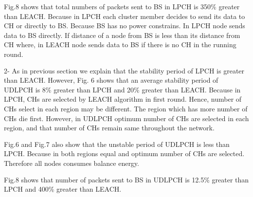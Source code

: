 \documentclass[journal]{IEEEtran}
\begin{document}
Fig.8 shows that total numbers of packets sent to BS in LPCH is 350\% greater than LEACH. Because in LPCH each cluster member decides to send its data to CH or directly to BS. Because BS has no power constrains. In LPCH node sends data to BS directly. If distance of a node from BS is less than its distance from CH where, in LEACH node sends data to BS if there is no CH in the running round.

{2}- As in previous section we explain that the stability period of LPCH is greater than LEACH. However, Fig. 6 shows that an average stability period of UDLPCH is 8\% greater than LPCH and 20\% greater than LEACH. Because in LPCH, CHs are selected by LEACH algorithm in first round. Hence, number of CHs select in each region may be different. The region which has more number of CHs die first. However, in UDLPCH optimum number of CHs are selected in each region, and that number of CHs remain same throughout the network.

Fig.6 and Fig.7 also show that the unstable period of UDLPCH is less than LPCH. Because in both regions equal and optimum number of CHs are selected. Therefore all nodes consumes balance energy.

Fig.8 shows that number of packets sent to BS  in UDLPCH is 12.5\% greater than  LPCH and 400\% greater than LEACH.
\end{document}
